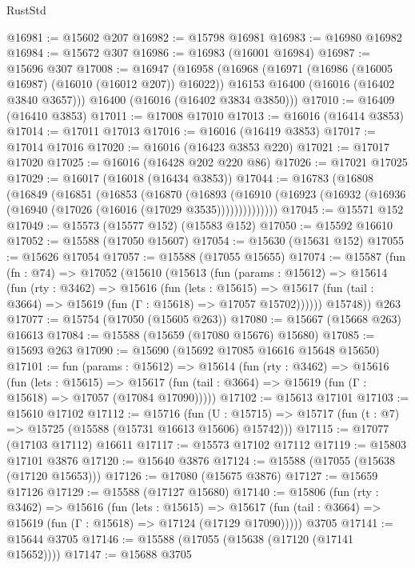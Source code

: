 \begin{lexlean}{RustStd}
\begin{coremodule}
@16981 := @15602 @207
@16982 := @15798 @16981
@16983 := @16980 @16982
@16984 := @15672 @307
@16986 := @16983 (@16001 @16984)
@16987 := @15696 @307
@17008 := @16947
    (@16958
      (@16968
        (@16971 (@16986 (@16005 @16987) (@16010 (@16012 @207)) @16022))
        @16153
        @16400
        (@16016 (@16402 @3840 @3657)))
      @16400
      (@16016 (@16402 @3834 @3850)))
@17010 := @16409 (@16410 @3853)
@17011 := @17008 @17010
@17013 := @16016 (@16414 @3853)
@17014 := @17011 @17013
@17016 := @16016 (@16419 @3853)
@17017 := @17014 @17016
@17020 := @16016 (@16423 @3853 @220)
@17021 := @17017 @17020
@17025 := @16016 (@16428 @202 @220 @86)
@17026 := @17021 @17025
@17029 := @16017 (@16018 (@16434 @3853))
@17044 := @16783
    (@16808
      (@16849
        (@16851
          (@16853
            (@16870
              (@16893
                (@16910 (@16923 (@16932 (@16936 (@16940 (@17026 (@16016 (@17029 @3535))))))))))))))
@17045 := @15571 @152
@17049 := @15573 (@15577 @152) (@15583 @152)
@17050 := @15592 @16610
@17052 := @15588 (@17050 @15607)
@17054 := @15630 (@15631 @152)
@17055 := @15626 @17054
@17057 := @15588 (@17055 @15655)
@17074 := @15587
    (fun (fn : @74) =>
    @17052
      (@15610
        (@15613
          (fun (params : @15612) =>
          @15614
            (fun (rty : @3462) =>
            @15616
              (fun (lets : @15615) =>
              @15617 (fun (tail : @3664) => @15619 (fun (Γ : @15618) => @17057 @15702))))))
        @15748))
    @263
@17077 := @15754 (@17050 (@15605 @263))
@17080 := @15667 (@15668 @263) @16613
@17084 := @15588 (@15659 (@17080 @15676) @15680)
@17085 := @15693 @263
@17090 := @15690 (@15692 @17085 @16616 @15648 @15650)
@17101 := fun (params : @15612) =>
  @15614
    (fun (rty : @3462) =>
    @15616
      (fun (lets : @15615) =>
      @15617 (fun (tail : @3664) => @15619 (fun (Γ : @15618) => @17057 (@17084 @17090)))))
@17102 := @15613 @17101
@17103 := @15610 @17102
@17112 := @15716
    (fun (U : @15715) => @15717 (fun (t : @7) => @15725 (@15588 (@15731 @16613 @15606) @15742)))
@17115 := @17077 (@17103 @17112) @16611
@17117 := @15573 @17102 @17112
@17119 := @15803 @17101 @3876
@17120 := @15640 @3876
@17124 := @15588 (@17055 (@15638 (@17120 @15653)))
@17126 := @17080 (@15675 @3876)
@17127 := @15659 @17126
@17129 := @15588 (@17127 @15680)
@17140 := @15806
    (fun (rty : @3462) =>
    @15616
      (fun (lets : @15615) =>
      @15617 (fun (tail : @3664) => @15619 (fun (Γ : @15618) => @17124 (@17129 @17090)))))
    @3705
@17141 := @15644 @3705
@17146 := @15588 (@17055 (@15638 (@17120 (@17141 @15652))))
@17147 := @15688 @3705

\end{coremodule}
\end{lexlean}
